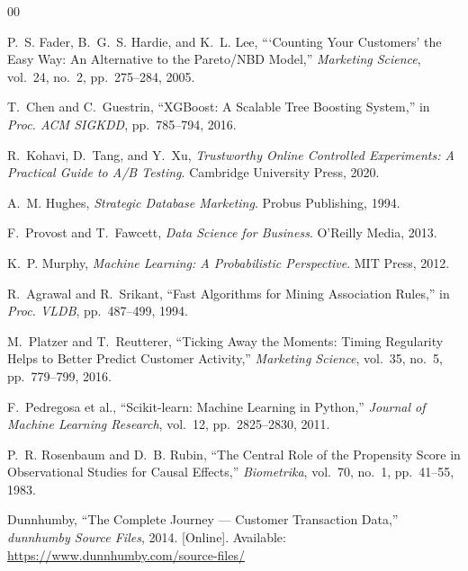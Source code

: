 \documentclass[conference]{IEEEtran}
\begin{document}
\begin{thebibliography}{00}

P.~S. Fader, B.~G.~S. Hardie, and K.~L. Lee,
```Counting Your Customers' the Easy Way: An Alternative to
the Pareto/NBD Model,''
\textit{Marketing Science}, vol.~24, no.~2,
pp.~275--284, 2005.

T.~Chen and C.~Guestrin,
``XGBoost: A Scalable Tree Boosting System,''
in \textit{Proc. ACM SIGKDD}, pp.~785--794, 2016.



R.~Kohavi, D.~Tang, and Y.~Xu,
\textit{Trustworthy Online Controlled Experiments:
A Practical Guide to A/B Testing}.
Cambridge University Press, 2020.

A.~M. Hughes,
\textit{Strategic Database Marketing}.
Probus Publishing, 1994.

F.~Provost and T.~Fawcett,
\textit{Data Science for Business}.
O'Reilly Media, 2013.

K.~P. Murphy,
\textit{Machine Learning: A Probabilistic Perspective}.
MIT Press, 2012.

R.~Agrawal and R.~Srikant,
``Fast Algorithms for Mining Association Rules,''
in \textit{Proc. VLDB}, pp.~487--499, 1994.

M.~Platzer and T.~Reutterer,
``Ticking Away the Moments: Timing Regularity Helps to
Better Predict Customer Activity,''
\textit{Marketing Science}, vol.~35, no.~5,
pp.~779--799, 2016.

F.~Pedregosa et al.,
``Scikit-learn: Machine Learning in Python,''
\textit{Journal of Machine Learning Research}, vol.~12,
pp.~2825--2830, 2011.

P.~R. Rosenbaum and D.~B. Rubin,
``The Central Role of the Propensity Score in
Observational Studies for Causal Effects,''
\textit{Biometrika}, vol.~70, no.~1, pp.~41--55, 1983.

Dunnhumby,
``The Complete Journey --- Customer Transaction Data,''
\textit{dunnhumby Source Files}, 2014.
[Online]. Available: \url{https://www.dunnhumby.com/source-files/}



\end{thebibliography}
\end{document}
